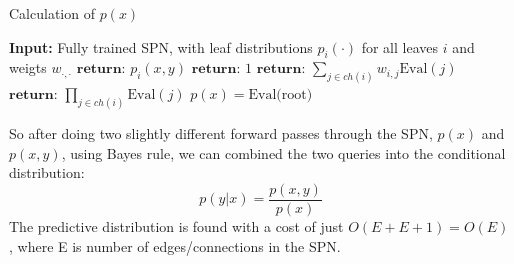 \begin{algorithm}[H]
    \caption*{Calculation of $p(x)$}\label{SPN}
    \begin{algorithmic}
    \State \textbf{Input:} Fully trained SPN, with leaf distributions $p_i(\cdot)$ for all leaves $i$ and weigts $w_{\cdot,\cdot}$ 
            \State  $\textbf{return: } p_i(x,y)$ 
        \Else 
            \State  $\textbf{return: } 1$ 
        \EndIf
    \EndIf
        \State $\textbf{return: } \sum_{j\in ch(i)} w_{i,j} \text{Eval}(j)$
    \EndIf
        \State $\textbf{return: } \prod_{j \in ch(i)} \text{Eval}(j)$
    \EndIf
    \EndFunction
    \State $p(x) =  \text{Eval(root)}$
    \end{algorithmic}
\end{algorithm}

So after doing two slightly different forward passes through the SPN, 
$p(x)$ and $p(x,y)$, using Bayes rule,
we can combined the two queries into the conditional distribution: 
$$p(y|x) = \frac{p(x,y)}{p(x)}$$
The predictive distribution is found with a cost of just $O(E+E+1) = O(E)$, where E is number
of edges/connections in the SPN. 


